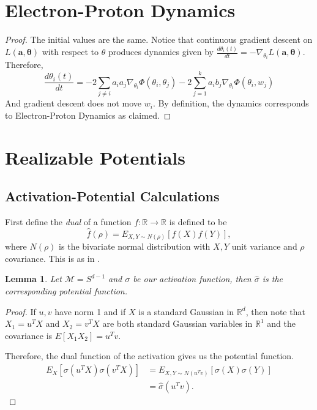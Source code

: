 \documentclass{article}
\newtheorem{lemma}[theorem]{Lemma}
\newcommand{\R}{{\mathbb{R}}}
\begin{document}
\newpage
\appendix

\section{Electron-Proton Dynamics}

\epdyn

\begin{proof}
The initial values are the same. Notice that continuous gradient descent on $L(\boldsymbol{a,\theta})$ with respect to $\theta$ produces dynamics given by $\frac{d\theta_i(t)}{dt} = -\nabla_{\theta_i}L(\boldsymbol{a,\theta})$. Therefore,
\[\frac{d\theta_i(t)}{dt} = -2\sum_{j \neq i} a_i a_j
\nabla_{\theta_i}\Phi(\theta_i,\theta_j) - 2\sum_{j=1}^k
a_ib_j\nabla_{\theta_i} \Phi(\theta_i,w_j)\] 
And gradient descent does not move $w_i$. By definition, the dynamics corresponds to Electron-Proton Dynamics as claimed.
\end{proof}


\section{Realizable Potentials}
\label{realizable}

\subsection{Activation-Potential Calculations}
First define the {\it dual} of a function $f: \R \to \R$ is defined to be 
%
\[ \widehat{f}(\rho) = E_{X,Y \sim N(\rho)}[f(X)f(Y)],\]
%
where $N(\rho)$ is the bivariate normal distribution with $X, Y$ unit variance and $\rho$ covariance. This is as in \cite{DanielyFS16}.
%
\begin{lemma}\label{rotLem}
Let $\mathcal{M} = S^{d-1}$ and $\sigma$ be our activation function, then $\widehat{\sigma}$ is the corresponding potential function.
\end{lemma}

\begin{proof}
If $u, v$ have norm 1 and if $X$ is a standard Gaussian in $\R^d$, then note that $X_1 = u^TX$ and $X_2 = v^TX$ are both standard Gaussian variables in $\R^1$ and the covariance is $E[X_1X_2] = u^Tv$. 

Therefore, the dual function of the activation gives us the potential function.
\begin{align*}
E_{X}[\sigma(u^TX)\sigma(v^TX)] & =
E_{X,Y \sim N(u^Tv)}[\sigma(X)\sigma(Y)] \\
& = \widehat{\sigma}(u^Tv).
\end{align*}
\end{proof}
\end{document}

